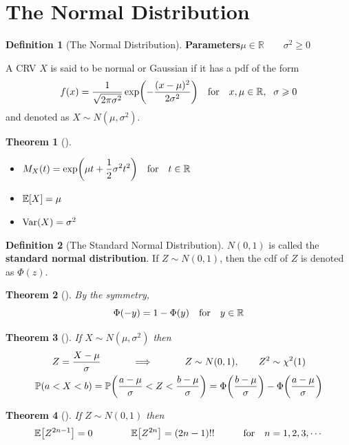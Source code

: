 \documentclass[10pt,UTF8]{article}
\newenvironment{definition box}
{\begin{tcolorbox}[colback=blue!5!white,colframe=blue!75!black,parbox=false,before upper=\par,before lower=\par]}
{\end{tcolorbox}}
\newenvironment{theorem box}
{\begin{tcolorbox}[colback=yellow!5!white,colframe=yellow!75!black,parbox=false,before upper=\par,before lower=\par]}
{\end{tcolorbox}}
\theoremstyle{definition}
\newtheorem{definition inner}{Definition}[section]
\newenvironment{definition}[1][]
{\begin{definition box}\begin{definition inner}[#1]\hfill\par}
{\end{definition inner}\end{definition box}}
\theoremstyle{plain}
\newtheorem{theorem inner}{Theorem}[section]
\newenvironment{theorem}[1][]
{\begin{theorem box}\begin{theorem inner}[#1]\hfill\par}
{\end{theorem inner}\end{theorem box}}
\theoremstyle{definition}
\newtheorem*{proof inner}{\textit{Proof}}
\theoremstyle{remark}
\newcommand{\E}[1]{\mathbb{E}\qty[#1]}  %
\newcommand{\Prob}{\mathbb{P}\qty}
\newcommand{\Var}[1]{\mathrm{Var}\qty(#1)}  %
\begin{document}
\section{The Normal Distribution}

\begin{definition}[The Normal Distribution]
    \textbf{Parameters}\qquad $\mu\in\mathbb{R}\qquad\sigma^2\geqslant 0$

    A CRV $X$ is said to be normal or Gaussian if it has a pdf of the form
    \begin{equation*}
        f(x) = \frac{1}{\sqrt{2\pi\sigma^2}}\exp(-\frac{(x-\mu)^2}{2\sigma^2})
        \qfor x,\mu\in\mathbb{R},\ \;\sigma\geqslant 0
    \end{equation*}
    and denoted as $X\sim N(\mu,\sigma^2)$.
\end{definition}

\begin{theorem}
    \begin{itemize}
        \item $\displaystyle M_X(t) =
        \exp(\mu t + \frac{1}{2}\sigma^2 t^2)
        \qfor t\in\mathbb{R}$
        \item $\E{X} = \mu$
        \item $\Var{X} = \sigma^2$
    \end{itemize}
\end{theorem}

\begin{definition}[The Standard Normal Distribution]
    $N(0,1)$ is called the \textbf{standard normal distribution}.
    If $Z\sim N(0,1)$, then the cdf of $Z$ is denoted as $\Phi(z)$.
\end{definition}

\begin{theorem}
    By the symmetry,
    \begin{equation*}
        \Phi(-y) = 1 - \Phi(y) \qfor y\in\mathbb{R}
    \end{equation*}
\end{theorem}

\begin{theorem}
    If $X\sim N(\mu,\sigma^2)$ then
    \begin{gather*}
        Z=\frac{X-\mu}{\sigma}
        \qquad\quad\implies\qquad\quad
        Z\sim N(0,1), \qquad
        Z^2\sim\chi^2(1) \\
        \Prob(a < X < b) =
        \Prob(\frac{a-\mu}{\sigma} < Z < \frac{b-\mu}{\sigma})
        = \Phi\qty(\frac{b-\mu}{\sigma}) - \Phi\qty(\frac{a-\mu}{\sigma})
    \end{gather*}
\end{theorem}
\begin{theorem}
    If $Z\sim N(0,1)$ then
    \begin{equation*}
        \E{Z^{2 n-1}}=0
        \qquad\qquad
        \E{Z^{2 n}}=(2 n-1)!!
        \qquad\qfor n=1,2,3,\cdots
    \end{equation*}
\end{theorem}
\end{document}
